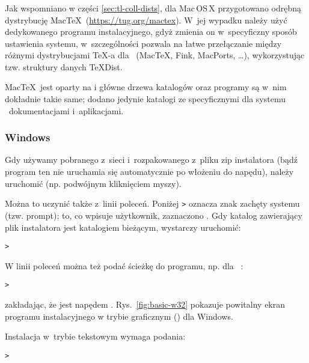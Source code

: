 \documentclass{article}
\begin{document}
\subsubsection{\MacOSX}
\label{sec:macosx}

Jak wspomniano w części \ref{sec:tl-coll-dists}, dla Mac\,OS\,X{}
przygotowano odrębną dystrybucję Mac\TeX\ (\url{https://tug.org/mactex}).
W~jej wypadku należy użyć dedykowanego programu instalacyjnego, gdyż
zmienia on w~specyficzny sposób ustawienia systemu, w~szczególności pozwala
na łatwe przełączanie między różnymi dystrybucjami \TeX-a dla
\MacOSX\ (Mac\TeX, Fink, MacPorts, \ldots), wykorzystując tzw.
struktury danych \TeX{}Dist.

Mac\TeX\ jest oparty na \TL{} i główne drzewa katalogów oraz programy są
w~nim dokładnie takie same; dodano jedynie katalogi ze specyficznymi dla
systemu \MacOSX\ dokumentacjami i~aplikacjami.



\subsubsection{Windows}\label{sec:wininst}

Gdy używamy pobranego z~sieci i~rozpakowanego z~pliku zip instalatora
(bądź program ten nie uruchamia się  automatycznie po włożeniu \DVD{}
do napędu), należy uruchomić  (np.
podwójnym kliknięciem myszy). %

Można to uczynić także  z~linii poleceń.  Poniżej \texttt{>} oznacza znak zachęty systemu (tzw. prompt); to,
co wpisuje użytkownik, zaznaczono .
Gdy katalog zawierający plik instalatora
jest katalogiem bieżącym, wystarczy uruchomić:
\begin{alltt}
> 
\end{alltt}

W linii poleceń można też podać ścieżkę do programu, np.
dla \TK\ \DVD:
\begin{alltt}
> 
\end{alltt}
zakładając, że  jest napędem \DVD.
Rys.~\ref{fig:basic-w32} pokazuje powitalny ekran programu instalacyjnego w trybie  graficznym (\GUI) dla Windows.

Instalacja w~trybie tekstowym wymaga podania:
\begin{alltt}
> 
\end{alltt}
\end{document}
